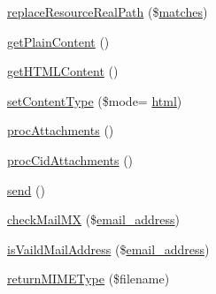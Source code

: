 \begin{DoxyCompactItemize}
\item 
\hyperlink{classMail_ae3182bb75fb675d2baceaf2c38dc7edd}{replace\+Resource\+Real\+Path} (\$\hyperlink{jquery_8mobile_8customized_8min_8js_a0dd9fb10d0da7ad1a1c71aad2c6388f7}{matches})
\item 
\hyperlink{classMail_ac1a5a2b325a14e6331f13d2b2b18d9f8}{get\+Plain\+Content} ()
\item 
\hyperlink{classMail_a74db66148c78f2e732a3f2797b108eae}{get\+H\+T\+M\+L\+Content} ()
\item 
\hyperlink{classMail_adc8e047b6acd8b183bac7082180cb18f}{set\+Content\+Type} (\$mode= \textquotesingle{}\hyperlink{JSSpec_8js_a28141bc89afb42a8f39e596105992271}{html}\textquotesingle{})
\item 
\hyperlink{classMail_a136e94d3b4ae6cea8944cf05f58754ce}{proc\+Attachments} ()
\item 
\hyperlink{classMail_a185f66ac96139a53251ede273a120d13}{proc\+Cid\+Attachments} ()
\item 
\hyperlink{classMail_a6520941b529c223c1b59ec7544f7f7d6}{send} ()
\item 
\hyperlink{classMail_a0bdfc629861cf1048ac189d61fd57ef4}{check\+Mail\+MX} (\$\hyperlink{ko_8install_8php_a1dffea0d5ba8194f8ef01f414af0c831}{email\+\_\+address})
\item 
\hyperlink{classMail_a2d7fd899ae79dc18e7804a044127dbac}{is\+Vaild\+Mail\+Address} (\$\hyperlink{ko_8install_8php_a1dffea0d5ba8194f8ef01f414af0c831}{email\+\_\+address})
\item 
\hyperlink{classMail_afe036d54e43919318cb8e081533e7b90}{return\+M\+I\+M\+E\+Type} (\$filename)
\end{DoxyCompactItemize}
